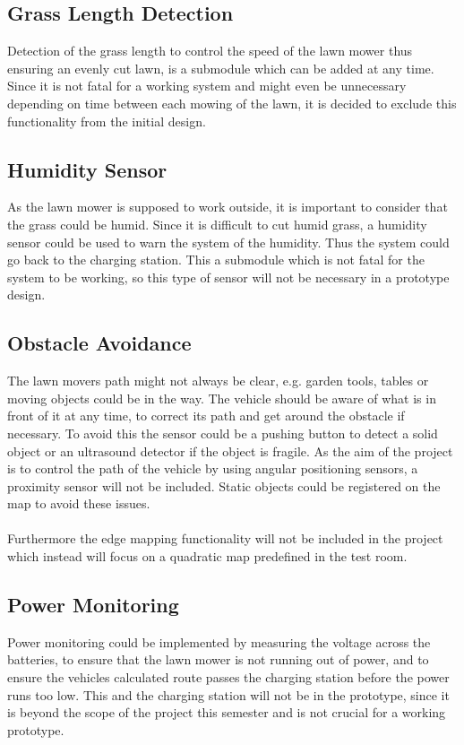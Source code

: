 
\subsection{Grass Length Detection}
Detection of the grass length to control the speed of the lawn mower thus ensuring an evenly cut lawn, is a submodule which can be added at any time. Since it is not fatal for a working system and might even be unnecessary depending on time between each mowing of the lawn, it is decided to exclude this functionality from the initial design.

\subsection{Humidity Sensor}
As the lawn mower is supposed to work outside, it is important to consider that the grass could be humid. Since it is difficult to cut humid grass, a humidity sensor could be used to warn the system of the humidity. Thus the system could go back to the charging station. This a submodule which is not fatal for the system to be working, so this type of sensor will not be necessary in a prototype design.

\subsection{Obstacle Avoidance}
The lawn movers path might not always be clear, e.g. garden tools, tables or moving objects could be in the way. The vehicle should be aware of what is in front of it at any time, to correct its path and get around the obstacle if necessary. To avoid this the sensor could be a pushing button to detect a solid object or an ultrasound detector if the object is fragile.
As the aim of the project is to control the path of the vehicle by using angular positioning sensors, a proximity sensor will not be included. Static objects could be registered on the map to avoid these issues.\\\\
Furthermore the edge mapping functionality will not be included in the project which instead will focus on a quadratic map predefined in the test room.

\subsection{Power Monitoring}
Power monitoring could be implemented by measuring the voltage across the batteries, to ensure that the lawn mower is not running out of power, and to ensure the vehicles calculated route passes the charging station before the power runs too low.
This and the charging station will not be in the prototype, since it is beyond the scope of the project this semester and is not crucial for a working prototype.

